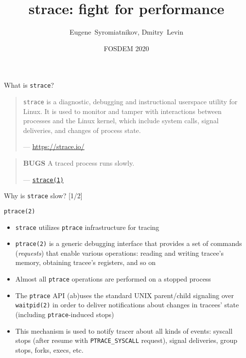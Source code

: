\documentclass[unicode]{beamer}
\title{\Huge strace: fight for performance}
\author{Eugene~Syromiatnikov, Dmitry~Levin}
\date{FOSDEM 2020}
\begin{document}
\begin{frame}
\titlepage
\end{frame}

\begin{frame}{What is \texttt{strace}?}
\begin{quote}
\texttt{strace} is a diagnostic, debugging and instructional userspace
utility for Linux.
It is used to monitor and tamper with interactions between processes
and the Linux kernel, which include system calls, signal deliveries,
and changes of process state.

\begin{flushright}
— \url{https://strace.io/}
\end{flushright}
\end{quote}
\pause
\begin{quote}
\textbf{BUGS}
\linebreak
A traced process runs slowly.
\begin{flushright}
— \href{http://man7.org/linux/man-pages/man1/strace.1.html\#BUGS}{\texttt{strace(1)}}
\end{flushright}
\end{quote}
\end{frame}

\begin{frame}{Why is \texttt{strace} slow? \hfill [1/2]}
\pause
\begin{block}{\large \texttt{ptrace(2)}}
\begin{itemize}
  \item \texttt{strace} utilizes \texttt{ptrace} infrastructure for tracing
  \item \texttt{ptrace(2)} is a generic debugging interface that provides
        a set of commands (\emph{requests}) that enable various operations:
	reading and writing tracee's memory, obtaining tracee's registers,
	and so on
  \item Almost all \texttt{ptrace} operations are performed on a stopped process
  \item The \texttt{ptrace} API (ab)uses the standard UNIX parent/child
        signaling over \texttt{waitpid(2)} in order to deliver notifications
	about changes in tracees' state (including \texttt{ptrace}-induced
	stops)
  \item This mechanism is used to notify tracer about all kinds of events:
        syscall stops (after resume with \texttt{PTRACE\_SYSCALL} request),
	signal deliveries, group stops, forks, execs, etc.
\end{itemize}
\end{block}
\end{frame}
\end{document}
